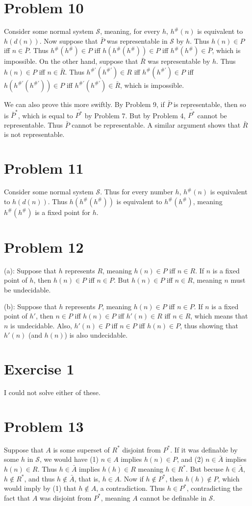 \documentclass{article}
\theoremstyle{definition}
\begin{document}
\section*{Problem 10}
Consider some normal system $\mathcal{S}$, meaning, for every $h$, $h^\#(n)$ is equivalent to $h(d(n))$. 
Now suppose that $\bar{P}$ was representable in $\mathcal{S}$ by $h$. Thus $h(n)\in P$ iff $n\in\bar{P}$. 
Thus $h^\#(h^\#)\in P$ iff $h(h^\#(h^\#))\in P$ iff $h^\#(h^\#)\in\bar{P}$, which is impossible. On the other hand, suppose that $\bar{R}$ was representable 
by $h$. Thus $h(n)\in P$ iff $n\in\bar{R}$. Thus $h^{\#'}(h^{\#'})\in R$ iff 
$h^\#(h^{\#'})\in P$ iff $h(h^{\#'}(h^{\#'}))\in P$ iff $h^{\#'}(h^{\#'})\in\bar{R}$, which is impossible. 


We can also prove this more swiftly. By Problem 9, if $\bar{P}$ is representable, then so is $\bar{P}^*$, which is equal to $\bar{P^*}$ by Problem 7. But by Problem 4, 
$\bar{P^*}$ cannot be representable. Thus $\bar{P}$ cannot be representable. A similar argument shows that $\bar{R}$ is not representable.

\section*{Problem 11}
Consider some normal system $\mathcal{S}$. Thus for every number $h$, $h^\#(n)$ is equivalent to $h(d(n))$. Thus $h(h^\#(h^\#))$ is equivalent to 
$h^\#(h^\#)$, meaning $h^\#(h^\#)$ is a fixed point for $h$.

\section*{Problem 12}
(a): Suppose that $h$ represents $R$, meaning $h(n)\in P$ iff $n\in R$. If $n$ is a fixed point of $h$, then $h(n)\in P$ iff $n\in P$. But $h(n)\in P$ iff 
$n\in R$, meaning $n$ must be undecidable. 


(b): Suppose that $h$ represents $P$, meaning $h(n)\in P$ iff $n\in P$. If $n$ is a fixed point of $h'$, then $n\in P$ iff $h(n)\in P$ iff $h'(n)\in R$ iff $n\in R$, which 
means that $n$ is undecidable. Also, $h'(n)\in P$ iff $n\in P$ iff $h(n)\in P$, thus showing that $h'(n)$ (and $h(n)$) is also undecidable.

\section*{Exercise 1}
I could not solve either of these.

\section*{Problem 13}
Suppose that $A$ is some superset of $R^*$ disjoint from $P^*$. If it was definable by some $h$ in $\mathcal{S}$, we would have (1) $n\in A$ implies $h(n)\in P$, and 
(2) $n\in\bar{A}$ implies $h(n)\in R$. Thus $h\in\bar{A}$ implies $h(h)\in R$ meaning $h\in R^*$. But becuse $h\in\bar{A}$, $h\notin R^*$, and thus $h\notin\bar{A}$, that is, 
$h\in A$. Now if $h\notin P^*$, then $h(h)\notin P$, which would imply by (1) that $h\notin A$, a contradiction. Thus $h\in P^*$, contradicting the fact that $A$ was disjoint
from $P^*$, meaning $A$ cannot be definable in $\mathcal{S}$.
\end{document}

